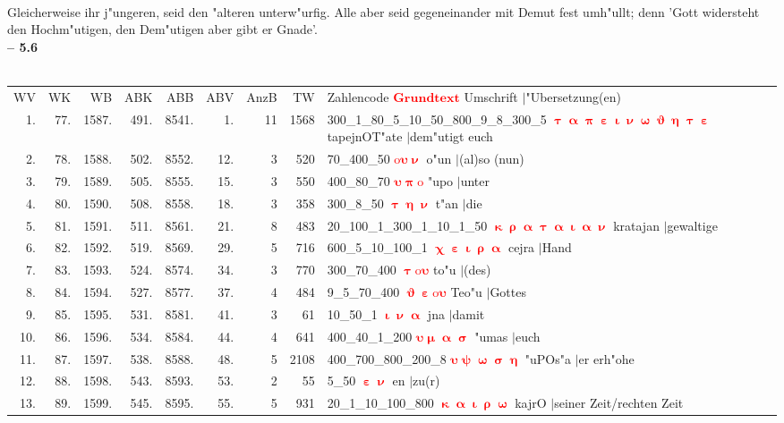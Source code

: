 \documentclass[a4paper,10pt,landscape]{article}
\begin{document}
\\
Gleicherweise ihr j"ungeren, seid den "alteren unterw"urfig. Alle aber seid gegeneinander mit Demut fest umh"ullt; denn 'Gott widersteht den Hochm"utigen, den Dem"utigen aber gibt er Gnade'.\\
\newpage 
{\bf -- 5.6}\\
\medskip \\
\begin{tabular}{rrrrrrrrp{120mm}}
WV&WK&WB&ABK&ABB&ABV&AnzB&TW&Zahlencode \textcolor{red}{$\boldsymbol{Grundtext}$} Umschrift $|$"Ubersetzung(en)\\
1.&77.&1587.&491.&8541.&1.&11&1568&300\_1\_80\_5\_10\_50\_800\_9\_8\_300\_5 \textcolor{red}{$\boldsymbol{\uptau\upalpha\uppi\upepsilon\upiota\upnu\upomega\upvartheta\upeta\uptau\upepsilon}$} tapejnOT"ate $|$dem"utigt euch\\
2.&78.&1588.&502.&8552.&12.&3&520&70\_400\_50 \textcolor{red}{$\boldsymbol{\mathrm{o}\upsilon\upnu}$} o"un $|$(al)so (nun)\\
3.&79.&1589.&505.&8555.&15.&3&550&400\_80\_70 \textcolor{red}{$\boldsymbol{\upsilon\uppi\mathrm{o}}$} "upo $|$unter\\
4.&80.&1590.&508.&8558.&18.&3&358&300\_8\_50 \textcolor{red}{$\boldsymbol{\uptau\upeta\upnu}$} t"an $|$die\\
5.&81.&1591.&511.&8561.&21.&8&483&20\_100\_1\_300\_1\_10\_1\_50 \textcolor{red}{$\boldsymbol{\upkappa\uprho\upalpha\uptau\upalpha\upiota\upalpha\upnu}$} kratajan $|$gewaltige\\
6.&82.&1592.&519.&8569.&29.&5&716&600\_5\_10\_100\_1 \textcolor{red}{$\boldsymbol{\upchi\upepsilon\upiota\uprho\upalpha}$} cejra $|$Hand\\
7.&83.&1593.&524.&8574.&34.&3&770&300\_70\_400 \textcolor{red}{$\boldsymbol{\uptau\mathrm{o}\upsilon}$} to"u $|$(des)\\
8.&84.&1594.&527.&8577.&37.&4&484&9\_5\_70\_400 \textcolor{red}{$\boldsymbol{\upvartheta\upepsilon\mathrm{o}\upsilon}$} Teo"u $|$Gottes\\
9.&85.&1595.&531.&8581.&41.&3&61&10\_50\_1 \textcolor{red}{$\boldsymbol{\upiota\upnu\upalpha}$} jna $|$damit\\
10.&86.&1596.&534.&8584.&44.&4&641&400\_40\_1\_200 \textcolor{red}{$\boldsymbol{\upsilon\upmu\upalpha\upsigma}$} "umas $|$euch\\
11.&87.&1597.&538.&8588.&48.&5&2108&400\_700\_800\_200\_8 \textcolor{red}{$\boldsymbol{\upsilon\uppsi\upomega\upsigma\upeta}$} "uPOs"a $|$er erh"ohe\\
12.&88.&1598.&543.&8593.&53.&2&55&5\_50 \textcolor{red}{$\boldsymbol{\upepsilon\upnu}$} en $|$zu(r)\\
13.&89.&1599.&545.&8595.&55.&5&931&20\_1\_10\_100\_800 \textcolor{red}{$\boldsymbol{\upkappa\upalpha\upiota\uprho\upomega}$} kajrO $|$seiner Zeit/rechten Zeit\\
\end{tabular}\medskip \\
\end{document}
